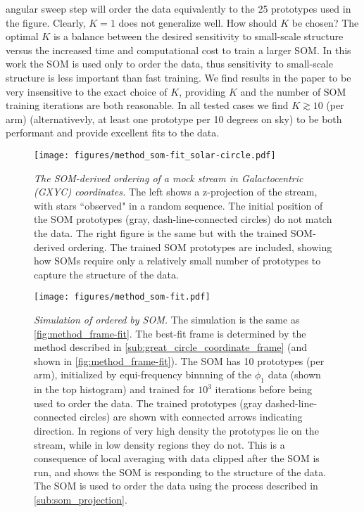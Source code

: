 \documentclass[fleqn,usenatbib]{mnras}
\begin{document}
      angular sweep step will order the data equivalently to the 25 prototypes
      used in the figure. Clearly, $K=1$ does not generalize well. How should
      $K$ be chosen? The optimal $K$ is a balance between the desired
      sensitivity to small-scale structure versus the increased time and
      computational cost to train a larger SOM. In this work the SOM is used
      only to order the data, thus sensitivity to small-scale structure is less
      important than fast training. We find results in the paper to be very
      insensitive to the exact choice of $K$, providing $K$ and the number of
      SOM training iterations are both reasonable. In all tested cases we find
      $K \gtrsim 10$ (per arm) (alternativevly, at least one prototype per 10
      degrees on sky) to be both performant and provide excellent fits to the
      data.

      \begin{figure}
        \centering
        \texttt{[image: figures/method\_som-fit\_solar-circle.pdf]}
        \caption{
          \emph{The SOM-derived ordering of a mock stream in Galactocentric (GXYC) coordinates.}
          The left shows a z-projection of the stream, with stars ``observed" in
          a random sequence. The initial position of the SOM prototypes (gray,
          dash-line-connected circles) do not match the data. The right figure
          is the same but with the trained SOM-derived ordering. The trained SOM
          prototypes are included, showing how SOMs require only a relatively
          small number of prototypes to capture the structure of the data. }
        \label{fig:method_som-fit_solar-circle}
      \end{figure}

      \begin{figure}
        \centering
        \texttt{[image: figures/method\_som-fit.pdf]}
        \caption{
          \emph{Simulation of  ordered by SOM.}
          The  simulation is the same as
          \autoref{fig:method_frame-fit}. The best-fit frame is determined by
          the method described in \autoref{sub:great_circle_coordinate_frame}
          (and shown in \autoref{fig:method_frame-fit}). The SOM has 10
          prototypes (per arm), initialized by equi-frequency binnning of the
          $\phi_1$ data (shown in the top histogram) and trained for $10^3$
          iterations before being used to order the data. The trained prototypes
          (gray dashed-line-connected circles) are shown with connected arrows
          indicating direction. In regions of very high density the prototypes
          lie on the stream, while in low density regions they do not. This is a
          consequence of local averaging with data clipped after the SOM is run,
          and shows the SOM is responding to the structure of the data. The SOM
          is used to order the data using the process described in
          \autoref{sub:som_projection}. }
        \label{fig:method_som-fit}
      \end{figure}
\end{document}
